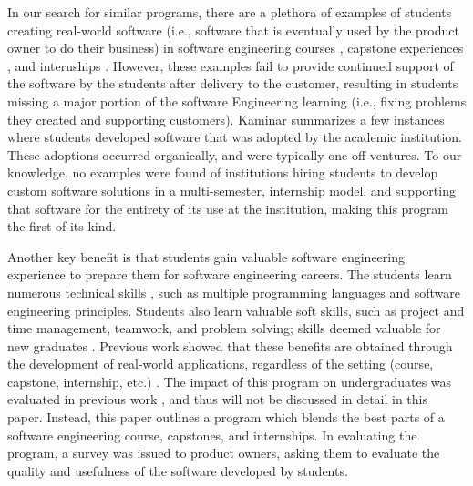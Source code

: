 In our search for similar programs, there are a plethora of examples of students creating real-world software (i.e., software that is eventually used by the product owner to do their business) in software engineering courses \cite{coursevsproject}, capstone experiences \cite{capstone}, and internships \cite{rochesterfirstundergradsoftwareteam}. However, these examples fail to provide continued support of the software by the students after delivery to the customer, resulting in students missing a major portion of the software Engineering learning (i.e., fixing problems they created and supporting customers). Kaminar \cite{kaminer_2014} summarizes a few instances where students developed software that was adopted by the academic institution. These adoptions occurred organically, and were typically one-off ventures. To our knowledge, no examples were found of institutions hiring students to develop custom software solutions in a multi-semester, internship model, and supporting that software for the entirety of its use at the institution, making this program the first of its kind. 

Another key benefit is that students gain valuable software engineering experience to prepare them for software engineering careers. The students learn numerous technical skills \cite{hardskills}, such as multiple programming languages and software engineering principles. Students also learn valuable soft skills, such as project and time management, teamwork, and problem solving; skills deemed valuable for new graduates \cite{lavy2013soft}. Previous work showed that these benefits are obtained through the development of real-world applications, regardless of the setting (course, capstone, internship, etc.) \cite{liu2005enriching}. The impact of this program on undergraduates was evaluated in previous work \cite{heggen2018hiring}, and thus will not be discussed in detail in this paper. Instead, this paper outlines a program which blends the best parts of a software engineering course, capstones, and internships. In evaluating the program, a survey was issued to product owners, asking them to evaluate the quality and usefulness of the software developed by students. 


